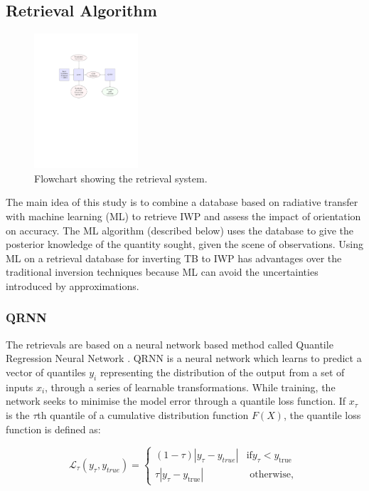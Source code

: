 \documentclass[amt, manuscript]{copernicus}
\begin{document}
\subsection{Retrieval Algorithm}
\label{sec:retrieval_algo}

\begin{figure}[t]
	\includegraphics[trim=100 410 100 125,clip,height = 50mm, ]{Figures/flowchart.pdf}
	\caption{Flowchart showing the retrieval system.}
	\label{fig:flowchart}
\end{figure}

The main idea of this study is to combine a database based on radiative transfer with machine learning (ML) to retrieve IWP and assess the impact of orientation on accuracy. The ML algorithm (described below) uses the database to give the posterior knowledge of the quantity sought, given the scene of observations. Using ML on a retrieval database for inverting TB to IWP has advantages over the traditional inversion techniques because ML can avoid the uncertainties introduced by approximations. 

\subsubsection{QRNN}
\label{sec:QRNN}

The retrievals are based on a neural network based method called Quantile Regression Neural Network \citep[QRNN,][]{pfreundschuh:aneur:18}. QRNN is a neural network which learns to predict a vector of quantiles {$y_i$} representing the distribution of the output from a set of inputs {$x_i$}, through a series of learnable transformations. While training, the network seeks to minimise the model error through a quantile loss function. If $x_{\tau}$ is the $\tau$th quantile of a cumulative distribution function $F(X)$, the quantile loss function is defined as:

\begin{equation}
\mathcal{L}_\tau(y_\tau, y_{true}) = \begin{cases}
(1 - \tau)|y_\tau - y_{true}| & \text{if}  y_\tau < y_\text{true}\\
\tau |y_\tau - y_\text{true}| & \text{ otherwise, }
\end{cases}
\label{loss_function}
\end{equation}
\end{document}
